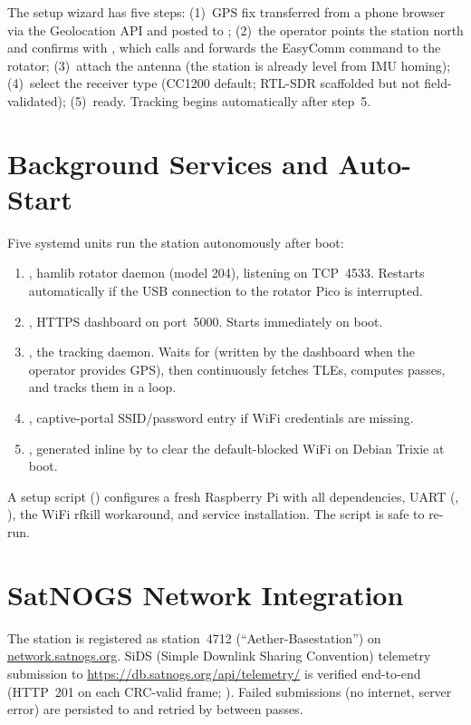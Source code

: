 The setup wizard has five steps: (1)~GPS fix transferred from a phone browser via the Geolocation API and posted to ; (2)~the operator points the station north and confirms with , which calls  and forwards the EasyComm  command to the rotator; (3)~attach the antenna (the station is already level from IMU homing); (4)~select the receiver type (CC1200 default; RTL-SDR scaffolded but not field-validated); (5)~ready. Tracking begins automatically after step~5.

\section{Background Services and Auto-Start}

Five systemd units run the station autonomously after boot:

\begin{enumerate}
    \item {}, hamlib rotator daemon (model 204), listening on TCP~4533. Restarts automatically if the USB connection to the rotator Pico is interrupted.
    \item {}, HTTPS dashboard on port~5000. Starts immediately on boot.
    \item {}, the tracking daemon. Waits for  (written by the dashboard when the operator provides GPS), then continuously fetches TLEs, computes passes, and tracks them in a loop.
    \item {}, captive-portal SSID/password entry if WiFi credentials are missing.
    \item {}, generated inline by  to clear the default-blocked WiFi on Debian Trixie at boot.
\end{enumerate}

A setup script () configures a fresh Raspberry Pi with all dependencies, UART (, ), the WiFi rfkill workaround, and service installation. The script is safe to re-run.

\section{SatNOGS Network Integration}
\label{sec:satnogs-integration}

The station is registered as station~4712 (``Aether-Basestation'') on \url{network.satnogs.org}. SiDS (Simple Downlink Sharing Convention) telemetry submission to \url{https://db.satnogs.org/api/telemetry/} is verified end-to-end (HTTP~201 on each CRC-valid frame; ). Failed submissions (no internet, server error) are persisted to  and retried by  between passes.

